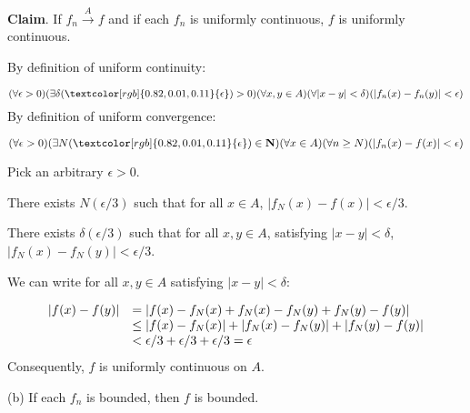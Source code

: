 \documentclass[10pt]{article}
\begin{document}
\textbf{Claim}. If $\displaystyle f_{n}\xrightarrow{A} f$ and if each $\displaystyle f_{n}$ is uniformly continuous, $\displaystyle f$ is uniformly continuous.



By definition of uniform continuity:


\begin{equation*}
( \forall \epsilon  >0)( \exists \delta (\textcolor[rgb]{0.82,0.01,0.11}{\epsilon })  >0)( \forall x,y\in A)( \forall |x-y|< \delta )( |f_{n}( x) -f_{n}( y) |< \epsilon )
\end{equation*}
By definition of uniform convergence:


\begin{equation*}
( \forall \epsilon  >0)( \exists N(\textcolor[rgb]{0.82,0.01,0.11}{\epsilon }) \in \mathbf{N})( \forall x\in A)( \forall n\geq N)( |f_{n}( x) -f( x) |< \epsilon )
\end{equation*}


Pick an arbitrary $\displaystyle \epsilon  >0$. 



There exists $\displaystyle N( \epsilon /3)$ such that for all $\displaystyle x\in A$, $\displaystyle |f_{N}( x) -f( x) |< \epsilon /3$. 



There exists $\displaystyle \delta ( \epsilon /3)$ such that for all $\displaystyle x,y\in A$, satisfying $\displaystyle |x-y|< \delta $, $\displaystyle |f_{N}( x) -f_{N}( y) |< \epsilon /3$.



We can write for all $\displaystyle x,y\in A$ satisfying $\displaystyle |x-y|< \delta $:


\begin{equation*}
\begin{array}{ c l }
|f( x) -f( y) | & =|f( x) -f_{N}( x) +f_{N}( x) -f_{N}( y) +f_{N}( y) -f( y) |\\
 & \leq |f( x) -f_{N}( x) |+|f_{N}( x) -f_{N}( y) |+|f_{N}( y) -f( y) |\\
 & < \epsilon /3+\epsilon /3+\epsilon /3=\epsilon 
\end{array}
\end{equation*}
Consequently, $\displaystyle f$ is uniformly continuous on $\displaystyle A$.



(b) If each $\displaystyle f_{n}$ is bounded, then $\displaystyle f$ is bounded. 
\end{document}
